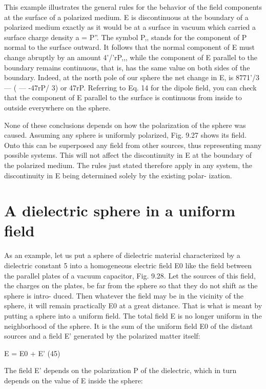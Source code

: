 {This example illustrates the general rules for the behavior of the
field components at the surface of a polarized medium. E is discontinuous
at the boundary of a polarized medium exactly as it
would be at a surface in vacuum which carried a surface charge
density a = P''. The symbol P,, stands for the component of P
normal to the surface outward. It follows that the normal component
of E must change abruptly by an amount 4'/'rP,,, while the
component of E parallel to the boundary remains continuous, that
is, has the same value on both sides of the boundary. Indeed, at the
north pole of our sphere the net change in E, is 8771'/3  ---  ( --- -47rP/ 3)
or 47rP. Referring to Eq. 14 for the dipole field, you can check that
the component of E parallel to the surface is continuous from inside
to outside everywhere on the sphere.

None of these conclusions depends on how the polarization of
the sphere was caused. Assuming any sphere is uniformly polarized,
Fig. 9.27 shows its field. Onto this can be superposed any field from
other sources, thus representing many possible systems. This will
not affect the discontinuity in E at the boundary of the polarized
medium. The rules just stated therefore apply in any system, the
discontinuity in E being determined solely by the existing polar-
ization.

\section{A dielectric sphere in a uniform field}

As an example, let us put a sphere of dielectric material characterized
by a dielectric constant 5 into a homogeneous electric field E0
like the field between the parallel plates of a vacuum capacitor,
Fig. 9.28. Let the sources of this field, the charges on the plates,
be far from the sphere so that they do not shift as the sphere is intro-
duced. Then whatever the field may be in the vicinity of the sphere,
it will remain practically E0 at a great distance. That is what is meant
by putting a sphere into a uniform field. The total field E is no
longer uniform in the neighborhood of the sphere. It is the sum of
the uniform field E0 of the distant sources and a field E' generated
by the polarized matter itself:

\begin{equation}
\end{equation}
E = E0 + E' (45)

The field E' depends on the polarization P of the dielectric, which in
turn depends on the value of E inside the sphere:

}
